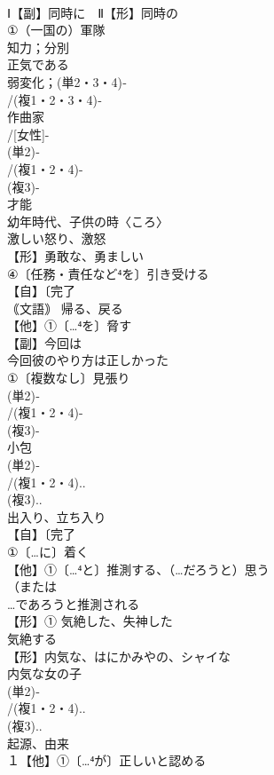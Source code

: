 \documentclass[8pt]{extreport}
\begin{document}
\begin{CJK}{UTF8}{min}
\\	Ⅰ【副】同時に　Ⅱ【形】同時の
\\	①（一国の）軍隊 
\\	知力；分別 
\\	正気である
\\	弱変化；(単2・3・4)‐
\\	/(複1・2・3・4)‐
\\	作曲家 
\\	/[女性]-
\\	(単2)‐
\\	/(複1・2・4)-
\\	(複3)-
\\	才能 
\\	幼年時代、子供の時〈ころ〉 
\\	激しい怒り、激怒 
\\	【形】勇敢な、勇ましい 
\\	④〔任務・責任など⁴を〕引き受ける 
\\	【自】〔完了
\\	｟文語｠ 帰る、戻る 
\\	【他】①〔…⁴を〕脅す 
\\	【副】今回は 
\\	今回彼のやり方は正しかった
\\	①〔複数なし〕見張り
\\	(単2)‐
\\	/(複1・2・4)-
\\	(複3)-
\\	小包
\\	(単2)‐
\\	/(複1・2・4)..
\\	(複3)..
\\	出入り、立ち入り
\\	【自】〔完了
\\	①〔…に〕着く 
\\	【他】①〔…⁴と〕推測する、（…だろうと）思う 
\\	（または
\\	…であろうと推測される
\\	【形】① 気絶した、失神した 
\\	気絶する
\\	【形】内気な、はにかみやの、シャイな 
\\	内気な女の子
\\	(単2)‐
\\	/(複1・2・4)..
\\	(複3)..
\\	起源、由来 
\\	１【他】①〔…⁴が〕正しいと認める 

\end{CJK}
\end{document}
